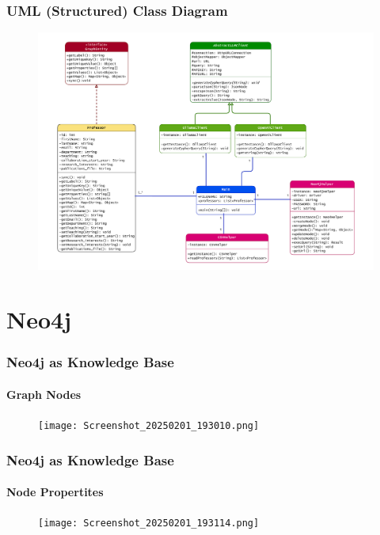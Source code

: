 \documentclass[
	11pt, %
]{beamer}
\begin{document}

\begin{frame}
	\frametitle{UML (Structured) Class Diagram}
	
	\begin{figure}
		\includegraphics[width=0.9\linewidth]{arch2.pdf}
	\end{figure}
\end{frame}


\section{Neo4j}

\begin{frame}
	\frametitle{Neo4j as Knowledge Base}
	\framesubtitle{Graph Nodes}
		\begin{figure}
		\texttt{[image: Screenshot\_20250201\_193010.png]}
	\end{figure}

\end{frame}

\begin{frame}
	\frametitle{Neo4j as Knowledge Base}
	\framesubtitle{Node Propertites}
		\begin{figure}
		\texttt{[image: Screenshot\_20250201\_193114.png]}
	\end{figure}

\end{frame}

\end{document}
